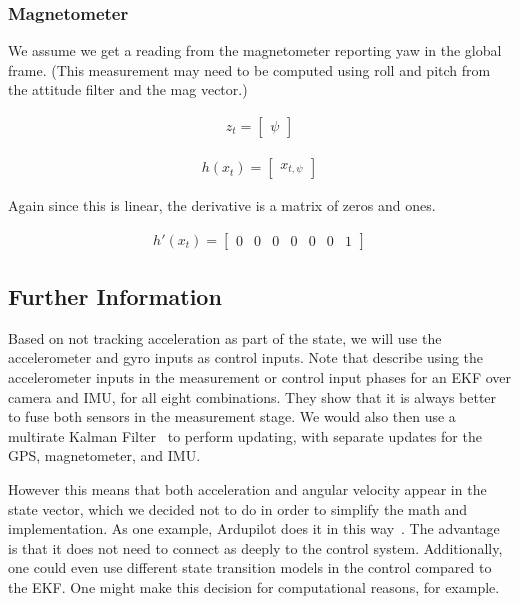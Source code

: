 \documentclass{article}
\begin{document}
\subsubsection{Magnetometer}

We assume we get a reading from the magnetometer reporting yaw in the
global frame.  (This measurement may need to be computed using roll
and pitch from the attitude filter and the mag vector.)
  
\begin{align}
  z_t=  \left[\begin{array}{c}
      \psi
      \end{array}\right]
  \end{align}


\begin{align}
  h(x_t) =  \left[\begin{array}{c}
      x_{t,\psi}
      \end{array}\right]
\end{align}

Again since this is linear, the derivative is a matrix of zeros and ones.

\begin{align}
  h'(x_t) = \left[\begin{array}{ccccccc}
      0&0&0&0&0&0&1
      \end{array}\right]
\end{align}

\subsection{Further Information}
Based on not tracking acceleration as part of the state, we will use
the accelerometer and gyro inputs as control inputs.  Note that
\citet{erdem2015fusing} describe using the accelerometer inputs in
the measurement or control input phases for an EKF over camera and
IMU, for all eight combinations.  They show that it is always better
to fuse both sensors in the measurement stage.  We would also then use
a multirate Kalman Filter~\citep{cristi2000multirate,
  quan2017introduction} to perform updating, with separate updates for
the GPS, magnetometer, and IMU.

  However this means that both acceleration and angular velocity appear
in the state vector, which we decided not to do in order to simplify
the math and implementation.  As one example, Ardupilot does it in
this way~\citep{ardupilotekf}.  The advantage is that it does not need
to connect as deeply to the control system.  Additionally, one could
even use different state transition models in the control compared to
the EKF.  One might make this decision for computational reasons, for
example.
\end{document}
